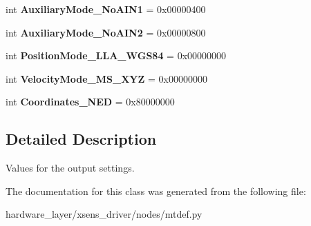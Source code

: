 \begin{DoxyCompactItemize}
\item 
\mbox{\label{classmtdef_1_1OutputSettings_ac56523c098fe50984c5f140843eb1e91}} 
int {\bfseries Auxiliary\+Mode\+\_\+\+No\+A\+I\+N1} = 0x00000400
\item 
\mbox{\label{classmtdef_1_1OutputSettings_a9b5d05844eb4be1d2cf172085df00acf}} 
int {\bfseries Auxiliary\+Mode\+\_\+\+No\+A\+I\+N2} = 0x00000800
\item 
\mbox{\label{classmtdef_1_1OutputSettings_ab62dd60f5832688443a2e45b4cb2d0fc}} 
int {\bfseries Position\+Mode\+\_\+\+L\+L\+A\+\_\+\+W\+G\+S84} = 0x00000000
\item 
\mbox{\label{classmtdef_1_1OutputSettings_a59cb8d9ae30e9a5706ecf85e3bd8fc82}} 
int {\bfseries Velocity\+Mode\+\_\+\+M\+S\+\_\+\+X\+YZ} = 0x00000000
\item 
\mbox{\label{classmtdef_1_1OutputSettings_a7fe2d76eb7a97487ef2a9aa47c82ec1c}} 
int {\bfseries Coordinates\+\_\+\+N\+ED} = 0x80000000
\end{DoxyCompactItemize}


\subsection{Detailed Description}
\begin{DoxyVerb}Values for the output settings.\end{DoxyVerb}
 

The documentation for this class was generated from the following file\+:\begin{DoxyCompactItemize}
\item 
hardware\+\_\+layer/xsens\+\_\+driver/nodes/mtdef.\+py\end{DoxyCompactItemize}
